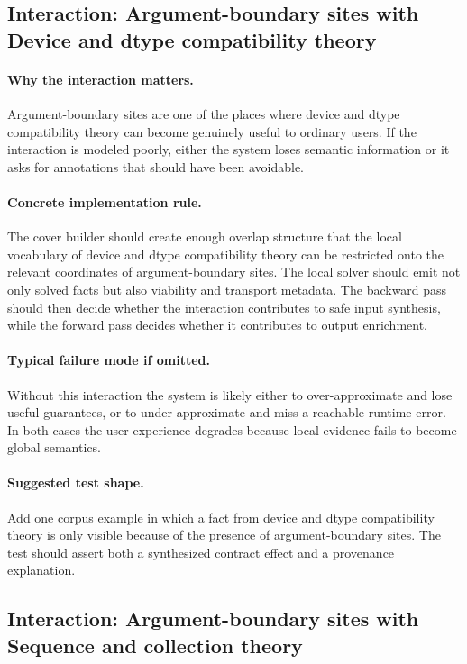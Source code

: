 \documentclass[11pt]{report}
\theoremstyle{definition}
\theoremstyle{plain}
\begin{document}
\subsection{Interaction: Argument-boundary sites with Device and dtype compatibility theory}

\paragraph{Why the interaction matters.}
Argument-boundary sites are one of the places where device and dtype compatibility theory can become
genuinely useful to ordinary users. If the interaction is modeled poorly,
either the system loses semantic information or it asks for annotations that
should have been avoidable.

\paragraph{Concrete implementation rule.}
The cover builder should create enough overlap structure that the local
vocabulary of device and dtype compatibility theory can be restricted onto the relevant
coordinates of argument-boundary sites. The local solver should emit not only
solved facts but also viability and transport metadata. The backward pass
should then decide whether the interaction contributes to safe input
synthesis, while the forward pass decides whether it contributes to output
enrichment.

\paragraph{Typical failure mode if omitted.}
Without this interaction the system is likely either to over-approximate and
lose useful guarantees, or to under-approximate and miss a reachable runtime
error. In both cases the user experience degrades because local evidence
fails to become global semantics.

\paragraph{Suggested test shape.}
Add one corpus example in which a fact from device and dtype compatibility theory is only
visible because of the presence of argument-boundary sites. The test should
assert both a synthesized contract effect and a provenance explanation.

\subsection{Interaction: Argument-boundary sites with Sequence and collection theory}
\end{document}

